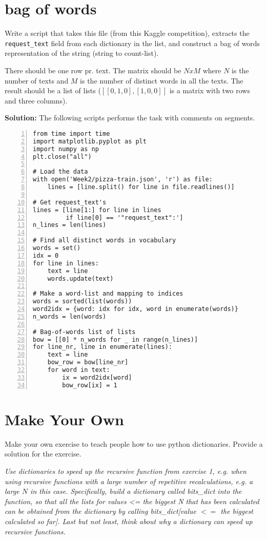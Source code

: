 \documentclass[12pt]{report}
\begin{document}
\clearpage
\section{bag of words}
Write a script that takes this file (from this Kaggle competition), extracts the \texttt{request\_text} field from each dictionary in the list, and construct a bag of words representation of the string (string to count-list).

There should be one row pr. text. The matrix should be $N x M$ where $N$ is the number of texts and $M$ is the number of distinct words in all the texts.  The result should be a list of lists ($[[0,1,0],[1,0,0]]$ is a matrix with two rows and three columns).

\textbf{Solution:}
The following scripts performs the task with comments on segments. 
\begin{framed}
\begin{lstlisting}[style=Python, numbers=left]
from time import time
import matplotlib.pyplot as plt
import numpy as np
plt.close("all")

# Load the data
with open('Week2/pizza-train.json', 'r') as file:
    lines = [line.split() for line in file.readlines()]

# Get request_text's
lines = [line[1:] for line in lines 
	     if line[0] == '"request_text":']
n_lines = len(lines)

# Find all distinct words in vocabulary
words = set()
idx = 0
for line in lines:
    text = line
    words.update(text)

# Make a word-list and mapping to indices
words = sorted(list(words))
word2idx = {word: idx for idx, word in enumerate(words)}
n_words = len(words)

# Bag-of-words list of lists
bow = [[0] * n_words for _ in range(n_lines)]
for line_nr, line in enumerate(lines):
    text = line
    bow_row = bow[line_nr]
    for word in text:
        ix = word2idx[word]
        bow_row[ix] = 1
\end{lstlisting}
\end{framed}

\clearpage
\section{Make Your Own}
Make your own exercise to teach people how to use python dictionaries. Provide a solution for the exercise. 

\textit{Use dictionaries to speed up the recursive function from exercise 1, e.g. when using recursive functions with a large number of repetitive recalculations, e.g. a large $N$ in this case. Specifically, build a dictionary called bits\_dict into the function, so that all the lists for values <= the biggest N that has been calculated can be obtained from the dictionary by calling bits\_dict[value $<=$ the biggest calculated so far]. Last but not least, think about why a dictionary can speed up recursive functions.}
\end{document}
